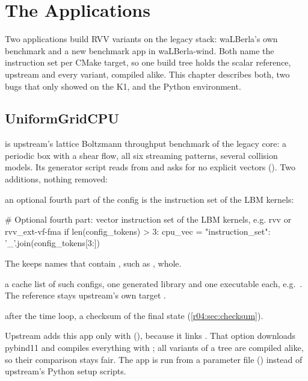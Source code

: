\chapter{The Applications}\label{r04:ch:apps}

Two applications build RVV variants on the legacy stack: waLBerla's own
 benchmark and a new benchmark app in waLBerla-wind. Both name the
instruction set per CMake target, so one build tree holds the scalar reference, upstream
 and every  variant, compiled alike. This chapter describes both,
two bugs that only showed on the K1, and the Python environment.

\section{UniformGridCPU}\label{r04:sec:ugc}

 is upstream's lattice Boltzmann throughput
benchmark of the legacy core: a periodic box with a shear flow, all six streaming
patterns, several collision models. Its generator script reads
 from  and asks for no explicit
vectors (). Two additions, nothing removed:
\begin{description}[style=nextline]
  \item[\file{UniformGridCPU.py}, 3 lines] an optional fourth part of the config is the
    instruction set of the LBM kernels:
\begin{pycode}
    # Optional fourth part: vector instruction set of the LBM kernels, e.g. rvv or rvv_ext-vf-fma
    if len(config_tokens) > 3:
        cpu_vec = {"instruction_set": '_'.join(config_tokens[3:])}
\end{pycode}
    The  keeps names that contain \code{_}, such as , whole.
  \item[\file{CMakeLists.txt}, 22 lines appended] a cache list
     of such configs, one generated library and one
    executable each, e.g.\ . The
    reference stays upstream's own target .
  \item[\file{UniformGridCPU.cpp}] after the time loop, a checksum of the final state
    (\cref{r04:sec:checksum}).
\end{description}
Upstream adds this app only with 
(), because it links .
That option downloads pybind11 and compiles everything with ; all variants
of a tree are compiled alike, so their comparison stays fair. The app is run from a
 parameter file () instead of
upstream's Python setup scripts.

